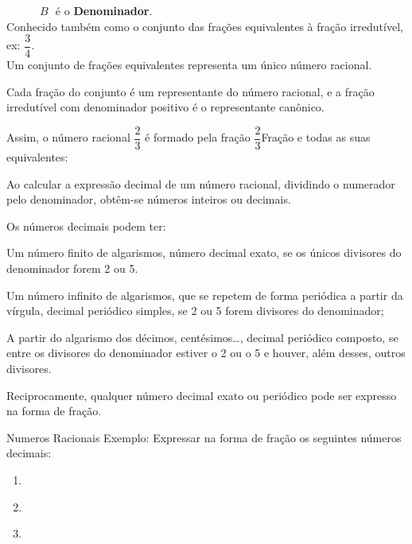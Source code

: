 \begin{multicols*}{2}
	$\, \, \, \, \, \, \, \, \, \, \, \, \, \, \, \, \, \,B \, \, $ é o \textbf{\color{blue}Denominador}.\\
			
	Conhecido também como o conjunto das frações equivalentes à fração irredutível, ex: $\dfrac{3}{4}$.\\

	Um conjunto de frações equivalentes representa um único número racional.

	Cada fração do conjunto é um representante do número racional, e a fração irredutível com denominador positivo é o representante canônico.

	Assim, o número racional $\dfrac{2}{3} $ é formado pela fração $\dfrac{2}{3} $Fração e todas as suas equivalentes:
	
	Ao calcular a expressão decimal de um número racional, dividindo o numerador pelo denominador, obtêm-se números inteiros ou decimais.

	Os números decimais podem ter:

	Um número finito de algarismos, número decimal exato, se os únicos divisores do denominador forem 2 ou 5.
	
	Um número infinito de algarismos, que se repetem de forma periódica a partir da vírgula, decimal periódico simples, se 2 ou 5 forem divisores do denominador;
	
A partir do algarismo dos décimos, centésimos…, decimal periódico composto, se entre os divisores do denominador estiver o 2 ou o 5 e houver, além desses, outros divisores.

Reciprocamente, qualquer número decimal exato ou periódico pode ser expresso na forma de fração.

Numeros Racionais
Exemplo:
Expressar na forma de fração os seguintes números decimais:

\begin{enumerate}

\item {}\\

\item {}\\

\item {} \\


\end{enumerate}
\end{multicols*}
